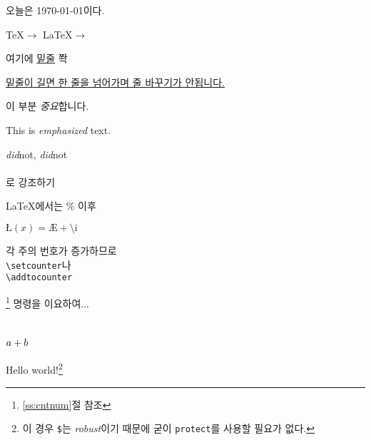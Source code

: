 \documentclass[11pt]{article}
\begin{document}
오늘은 \today 이다.

\TeX $\rightarrow$ \LaTeX $\rightarrow$ \LaTeXe

여기에 \underline{밑줄} 쫙

\underline{밑줄이 길면 한 줄을 넘어가며 줄 바꾸기가 안됩니다.}

이 부분 \emph{중요}합니다.

This is \emph{emphasized} text.

\emph{did}not, \emph{did\/}not \\ \\

로 강조하기

\LaTeX 에서는 \% 이후 %

$\mbox{\L}(x) = \mbox{\AE} + \mbox{\^\i}$

각 주의 번호가 증가하므로 \\
\verb+\setcounter+\footnotemark 나 \\ 
\verb+\addtocounter+\addtocounter{footnote}{-1}\footnote{\ref{ss:cntnum}절 참조} 명령을 이요하여...

\section{\protect\(a+b \protect\)}

Hello world!\footnote{이 경우 \texttt{\$}는 \emph{robust}이기 때문에 굳이 \texttt{protect}를 사용할 필요가 없다.}
\end{document}
